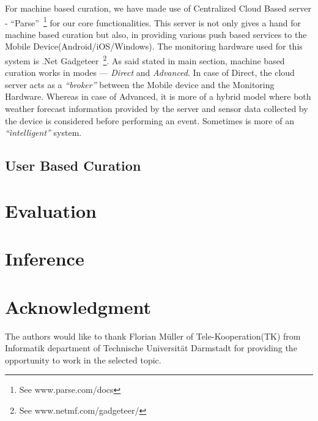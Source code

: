 \documentclass[10pt]{article}
\begin{document}
For machine based curation, we have made use of Centralized Cloud Based server - ``Parse''~\footnote{See www.parse.com/docs} for our core functionalities. This server is not only gives a hand for machine based curation but also, in providing various push based services to the Mobile Device(Android/iOS/Windows). The monitoring hardware used for this system is .Net Gadgeteer~\footnote{See www.netmf.com/gadgeteer/}. As said stated in main section, machine based curation works in modes --- \emph{Direct} and \emph{Advanced}. In case of Direct, the cloud server acts as a \emph{``broker''} between the Mobile device and the Monitoring Hardware. Whereas in case of Advanced, it is more of a hybrid model where both weather forecast information provided by the server and sensor data collected by the device is considered before performing an event. Sometimes is more of an \emph{``ìntelligent''} system.

\subsection*{User Based Curation}


\section*{Evaluation}


\section*{Inference}


\section*{Acknowledgment}

The authors would like to thank Florian Müller of Tele-Kooperation(TK) from Informatik department of Technische Universität Darmstadt for providing the opportunity to work in the selected topic.


\end{document}
